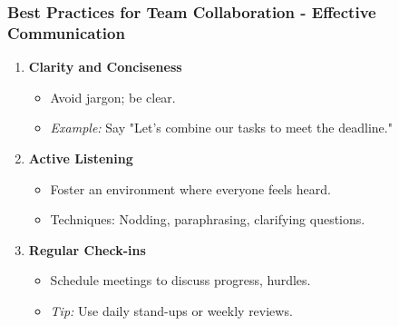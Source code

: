 \documentclass[aspectratio=169]{beamer}
\begin{document}
\begin{frame}[fragile]
    \frametitle{Best Practices for Team Collaboration - Effective Communication}
    \begin{enumerate}
        \item \textbf{Clarity and Conciseness} 
        \begin{itemize}
            \item Avoid jargon; be clear.
            \item \textit{Example:} Say "Let's combine our tasks to meet the deadline."
        \end{itemize}
        
        \item \textbf{Active Listening} 
        \begin{itemize}
            \item Foster an environment where everyone feels heard.
            \item Techniques: Nodding, paraphrasing, clarifying questions.
        \end{itemize}
        
        \item \textbf{Regular Check-ins} 
        \begin{itemize}
            \item Schedule meetings to discuss progress, hurdles.
            \item \textit{Tip:} Use daily stand-ups or weekly reviews.
        \end{itemize}
    \end{enumerate}
\end{frame}
\end{document}
